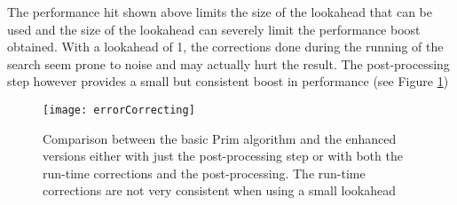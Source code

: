 The performance hit shown above limits the size of the lookahead that can be used and the size of the lookahead can severely limit the performance boost obtained. With a lookahead of 1, the corrections done during the running of the search seem prone to noise and may actually hurt the result. The post-processing step however provides a small but consistent boost in performance (see Figure \ref{fig:errorCorrecting})

\begin{figure}[h]
  \centering
  \texttt{[image: errorCorrecting]}
  \caption{Comparison between the basic Prim algorithm and the enhanced versions either with just the post-processing step or with both the run-time corrections and the post-processing. The run-time corrections are not very consistent when using a small lookahead}
  \label{fig:errorCorrecting}
\end{figure}
